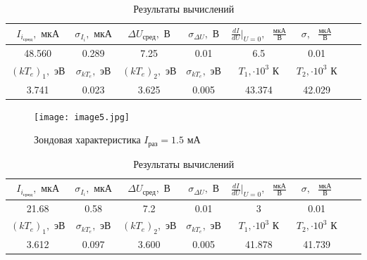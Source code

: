 \documentclass[a4paper,12pt]{article} %
\begin{document}
\begin{enumerate}
    \begin{table}[h]
	\centering
	\begin{tabular}{|c|c|c|c|c|c|c|c|}
            \hline
            $I_{i_\text{сред}}, \text{ мкА}$ & $\sigma_{I_{i}}, \text{ мкА}$ & $\Delta U_{\text{сред}}, \text{ В}$ & $\sigma_{\Delta U}, \text{ В}$ & $\frac{dI}{dU}|_{U=0}, \text{ }\frac{\text{мкА}}{\text{В}}$ & $\sigma, \text{ }\frac{\text{мкА}}{\text{В}}$ \\ \hline
            48.560 & 0.289 & 7.25 & 0.01 & 6.5 & 0.01 \\ \hline
            $(kT_{e})_1, \text{ эВ}$ & $\sigma_{kT_{e}}, \text{ эВ}$ & $(kT_{e})_2, \text{ эВ}$ & $\sigma_{kT_{e}}, \text{ эВ}$ & $T_1, \cdot 10^3 \text{ К}$ & $T_2, \cdot 10^3 \text{ К}$ \\ \hline
            3.741 & 0.023 & 3.625 & 0.005 & 43.374 & 42.029 \\ \hline
	\end{tabular}
	\caption{Результаты вычислений}
	\label{tab4}
    \end{table}

    \newpage

    \begin{figure}[h]
        \begin{center}
    		\texttt{[image: image5.jpg]}
        \end{center}
        \caption{Зондовая характеристика $I_{\text{раз}}=1.5 \text{ мА}$}
        \label{plot5}
    \end{figure}

    \begin{table}[h]
	\centering
	\begin{tabular}{|c|c|c|c|c|c|c|c|}
            \hline
            $I_{i_\text{сред}}, \text{ мкА}$ & $\sigma_{I_{i}}, \text{ мкА}$ & $\Delta U_{\text{сред}}, \text{ В}$ & $\sigma_{\Delta U}, \text{ В}$ & $\frac{dI}{dU}|_{U=0}, \text{ }\frac{\text{мкА}}{\text{В}}$ & $\sigma, \text{ }\frac{\text{мкА}}{\text{В}}$ \\ \hline
            21.68 & 0.58 & 7.2 & 0.01 & 3 & 0.01 \\ \hline
            $(kT_{e})_1, \text{ эВ}$ & $\sigma_{kT_{e}}, \text{ эВ}$ & $(kT_{e})_2, \text{ эВ}$ & $\sigma_{kT_{e}}, \text{ эВ}$ & $T_1, \cdot 10^3 \text{ К}$ & $T_2, \cdot 10^3 \text{ К}$ \\ \hline
            3.612 & 0.097 & 3.600 & 0.005 & 41.878 & 41.739  \\ \hline
	\end{tabular}
	\caption{Результаты вычислений}
	\label{tab5}
    \end{table}


\end{enumerate}
\end{document}
